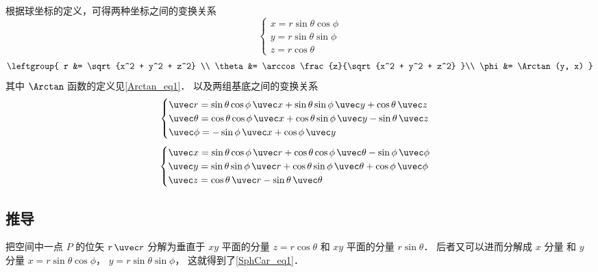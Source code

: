 

根据球坐标的定义，可得两种坐标之间的变换关系
\begin{equation}\label{SphCar_eq1}
\begin{cases}
x = r\sin \theta \cos \phi \\
y = r\sin \theta \sin \phi \\
z = r\cos \theta 
\end{cases}
\end{equation}
\begin{equation}\label{SphCar_eq2}
\leftgroup{
r &= \sqrt {x^2 + y^2 + z^2} \\
\theta  &= \arccos \frac{z}{\sqrt{x^2 + y^2 + z^2} }\\
\phi  &= \Arctan(y, x)
}\end{equation}
其中 $\Arctan$ 函数的定义见\autoref{Arctan_eq1}． 以及两组基底之间的变换关系
\begin{equation}\label{SphCar_eq3}
\begin{cases}
\uvec r = \sin\theta\cos\phi\,\uvec x + \sin\theta\sin\phi\,\uvec y + \cos\theta\,\uvec z\\
\uvec \theta = \cos\theta\cos\phi\,\uvec x + \cos\theta\sin\phi\,\uvec y - \sin\theta\,\uvec z\\
\uvec \phi =  - \sin\phi\,\uvec x + \cos\phi\,\uvec y
\end{cases}
\end{equation}
\begin{equation}\label{SphCar_eq4}
\begin{cases}
\uvec x = \sin \theta \cos \phi \,\uvec r + \cos \theta \cos \phi \,\uvec \theta  - \sin \phi \,\uvec \phi \\
\uvec y = \sin \theta \sin \phi \,\uvec r + \cos \theta \sin \phi \,\uvec \theta  + \cos \phi \,\uvec \phi \\
\uvec z = \cos \theta \,\uvec r - \sin \theta \,\uvec \theta
\end{cases}
\end{equation}

\subsection{推导}
把空间中一点 $P$ 的位矢 $r \,\uvec r$ 分解为垂直于 $xy$ 平面的分量 $z = r\cos \theta $ 和 $xy$ 平面的分量 $r\sin \theta $． 后者又可以进而分解成 $x$ 分量 和 $y$ 分量  $x = r\sin \theta \cos \phi$，  $y = r\sin \theta \sin \phi$， 这就得到了\autoref{SphCar_eq1}．

